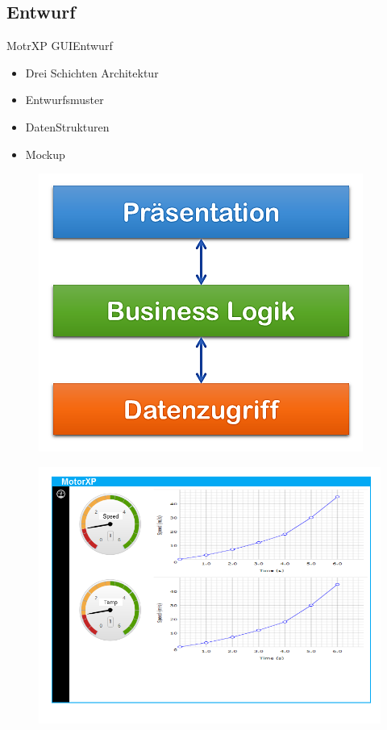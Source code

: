 	\subsection{Entwurf}
		\begin{frame}{MotrXP GUI}{Entwurf}
		\begin{minipage}{0.6\textwidth}
			\begin{itemize}
				\item Drei Schichten Architektur
	   	 		\item Entwurfsmuster
	    		\item DatenStrukturen
	    		\item Mockup
	  		\end{itemize}
		\end{minipage}
		\hfill
	  		\begin{minipage}{0.3\textwidth}
	  			\begin{figure}[htbp]
	  				\centering
	  				\includegraphics[width=\textwidth]{../gui/Bilder/Arc1.png}
	  			\end{figure}
	  			\begin{figure}[h]
	  				\centering
	  				\includegraphics[width=\textwidth]{../gui/Bilder/Mockup.png}
	  			\end{figure}
	  		\end{minipage}
	  		

\end{frame}
